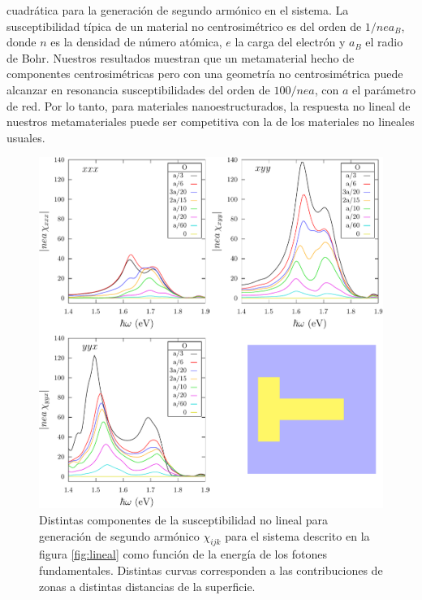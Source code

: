 \documentclass[12pt]{article}
\begin{document}
cuadrática para la generación de segundo armónico en el sistema. La
susceptibilidad típica de un material no centrosimétrico es del orden
de $1/nea_B$, donde $n$ es la densidad de número atómica, $e$ la carga
del electrón y $a_B$ el radio de Bohr. Nuestros resultados muestran
que un metamaterial hecho de componentes centrosimétricas pero con una
geometría no centrosimétrica puede alcanzar en resonancia
susceptibilidades del orden de $100/nea$, con $a$ el parámetro de
red. Por lo tanto, para materiales nanoestructurados, la respuesta no
lineal de nuestros metamateriales puede ser competitiva con la de los
materiales no lineales usuales.
\begin{figure}
  \centering
  \includegraphics[width=\textwidth]{figshg2}
  \caption{Distintas componentes de la susceptibilidad no lineal para
    generación de segundo armónico $\chi_{ijk}$ para el sistema
    descrito en la figura \ref{fig:lineal} como función de la energía
    de los fotones fundamentales. Distintas curvas corresponden a las
    contribuciones de zonas a distintas distancias de la superficie.}
  \label{fig:xi2}
\end{figure}
\end{document}
